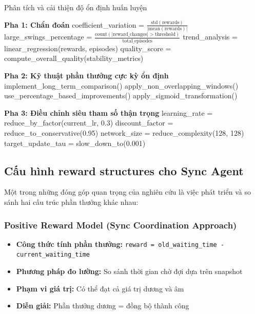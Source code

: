 \begin{algorithm}[!htp]
    \caption{Phân tích và cải thiện độ ổn định huấn luyện}
    \begin{algorithmic}[1]
        \State \textbf{Pha 1: Chẩn đoán}
        \State coefficient\_variation = $\frac{\text{std}(\text{rewards})}{|\text{mean}(\text{rewards})|}$
        \State large\_swings\_percentage = $\frac{\text{count}(|\text{reward\_changes}| > \text{threshold})}{\text{total\_episodes}}$
        \State trend\_analysis = linear\_regression(rewards, episodes)
        \State quality\_score = compute\_overall\_quality(stability\_metrics)
        
        \State \textbf{Pha 2: Kỹ thuật phần thưởng cực kỳ ổn định}
            \State implement\_long\_term\_comparison()
            \State apply\_non\_overlapping\_windows()
            \State use\_percentage\_based\_improvements()
            \State apply\_sigmoid\_transformation()
        \EndIf
        
        \State \textbf{Pha 3: Điều chỉnh siêu tham số thận trọng}
        \State learning\_rate = reduce\_by\_factor(current\_lr, 0.3)
        \State discount\_factor = reduce\_to\_conservative(0.95)
        \State network\_size = reduce\_complexity(128, 128)
        \State target\_update\_tau = slow\_down\_to(0.001)
    \end{algorithmic}
\end{algorithm}

\subsection{Cấu hình reward structures cho Sync Agent}

Một trong những đóng góp quan trọng của nghiên cứu là việc phát triển và so sánh
hai cấu trúc phần thưởng khác nhau:

\subsubsection{Positive Reward Model (Sync Coordination Approach)}
\begin{itemize}
    \item \textbf{Công thức tính phần thưởng:} \texttt{reward = old\_waiting\_time -         current\_waiting\_time}

    \item \textbf{Phương pháp đo lường:} So sánh thời gian chờ đợi dựa trên snapshot

    \item \textbf{Phạm vi giá trị:}  Có thể đạt cả giá trị dương và âm

    \item \textbf{Diễn giải:} Phần thưởng dương = đồng bộ thành công
\end{itemize}

